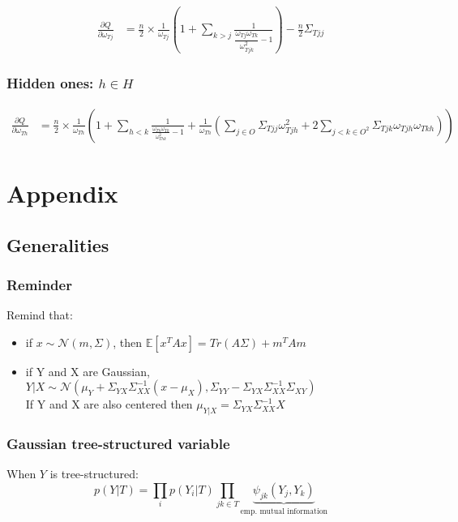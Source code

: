 \documentclass[11pt,a4paper]{article}
\newcommand{\Esp}{\mathds{E}}
\begin{document}
\begin{align*}
\frac{\partial Q}{\partial \omega_{Tj}}  &= \frac{n}{2}\times \frac{1}{\omega_{Tj}}\left( 1 + \sum_{k>j} \frac{1}{\dfrac{\omega_{Tj}\omega_{Tk}}{\omega_{Tjk} ^2} - 1}  \right) -\frac{n}{2} \Sigma_{Tjj}
\end{align*}




\subsubsection{Hidden ones: $h\in H$}
\begin{align*}
\frac{\partial Q}{\partial \omega_{Th}}  &= \frac{n}{2}\times \frac{1}{\omega_{Th}}\left(1 + \sum_{h<k} \frac{1}{\frac{\omega_{Th}\omega_{Tk}}{\omega_{Thk}^2}-1} + \frac{1}{\omega_{Th}} \left(\sum_{j \in O} \Sigma_{Tjj}\omega_{Tjh}^2 + 2\sum_{j<k \in O^2} \Sigma_{Tjk} \omega_{Tjh}\omega_{Tkh}\right) \right) 
\end{align*}

\newpage
\section{Appendix}

\subsection{Generalities}


\subsubsection{Reminder}
Remind that:
\begin{itemize}
\item if $x\sim\mathcal{N}(m, \Sigma)$, then
$\Esp[x^TAx] = Tr(A\Sigma) + m^TAm$
\item if Y and X are Gaussian, $Y|X \sim \mathcal{N}(\mu_Y+\Sigma_{YX}\Sigma_{XX}^{-1}(x-\mu_X) , \Sigma_{YY} - \Sigma_{YX}\Sigma_{XX}^{-1}\Sigma_{XY})$\\
If Y and X are also centered then $\mu_{Y|X} = \Sigma_{YX}\Sigma_{XX}^{-1} X$
\end{itemize}


\subsubsection{Gaussian tree-structured variable}
When $Y$ is tree-structured:
$$ p(Y|T) = \prod_i  p(Y_i|T) \prod_{jk\in T} \underbrace{\psi_{jk}(Y_j,Y_k)}_{\text{emp. mutual  information}}$$
\end{document}
